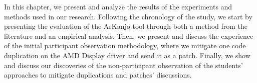 \en 

In this chapter, we present and analyze the results of the experiments and methods 
used in our research. Following the chronology of the study, we start by presenting 
the evaluation of the ArKanjo tool through both a method from the literature and an empirical
analysis. Then, we present and discuss the experience of the initial participant 
observation methodology, where we mitigate one code duplication on the AMD Display 
driver and send it as a patch. Finally, we show and discuss our discoveries of 
the non-participant observation of the students' approaches to mitigate duplications 
and patches' discussions.







